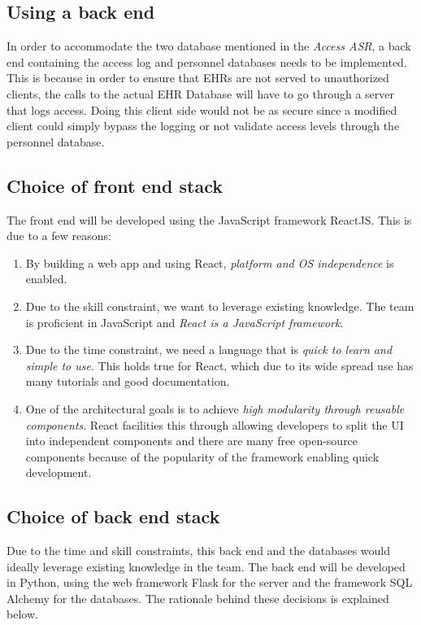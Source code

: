 \documentclass{article}
\begin{document}
\subsection{Using a back end}
In order to accommodate the two database mentioned in the \emph{Access ASR}, a back end containing the access log and personnel databases needs to be implemented. This is because in order to ensure that EHRs are not served to unauthorized clients, the calls to the actual EHR Database will have to go through a server that logs access. Doing this client side would not be as secure since a modified client could simply bypass the logging or not validate access levels through the personnel database.

\subsection{Choice of front end stack}
The front end will be developed using the JavaScript framework ReactJS. This is due to a few reasons:

\begin{enumerate}[label=(\roman*)]
\item By building a web app and using React, \emph{platform and OS independence} is enabled.
\item Due to the skill constraint, we want to leverage existing knowledge. The team is proficient in JavaScript and \emph{React is a JavaScript framework}.
\item Due to the time constraint, we need a language that is \emph{quick to learn and simple to use}. This holds true for React, which due to its wide spread use has many tutorials and good documentation.
\item One of the architectural goals is to achieve \emph{high modularity through reusable components}. React facilities this through allowing developers to split the UI into independent components and there are many free open-source components because of the popularity of the framework enabling quick development.
\end{enumerate}

\subsection{Choice of back end stack}
Due to the time and skill constraints, this back end and the databases would ideally leverage existing knowledge in the team. The back end will be developed in Python, using the web framework Flask for the server and the framework SQL Alchemy for the databases. The rationale behind these decisions is explained below.
\end{document}
